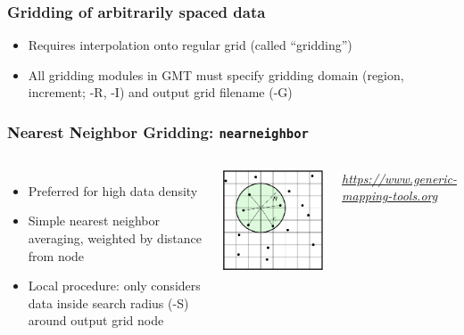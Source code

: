 \documentclass[unknownkeysallowed]{beamer}
\begin{document}
\begin{frame}[fragile=singleslide]
\frametitle{Gridding of arbitrarily spaced data}
	\begin{itemize}
		\item Requires interpolation onto regular grid (called ``gridding'')
		\item All gridding modules in GMT must specify gridding domain (region, increment; -R, -I) and output grid filename (-G)
	\end{itemize}
\end{frame}

\begin{frame}[fragile=singleslide]
\frametitle{Nearest Neighbor Gridding: {\tt nearneighbor}}
	\begin{columns}[t]
		\begin{itemize}
			\item Preferred for high data density
			\item Simple nearest neighbor averaging, weighted by distance from node
			\item Local procedure: only considers data inside search radius (-S) around output grid node
		\end{itemize}
		\begin{center}
			\includegraphics[width=.9\textwidth]{../figures/gmt_nearneighbor.png}	
		\end{center}
		\vspace{-0.5cm}
		\begin{flushright}
		\tiny{\emph{\url{https://www.generic-mapping-tools.org}}}
		\end{flushright}	
	\end{columns}
\end{frame}
\end{document}
